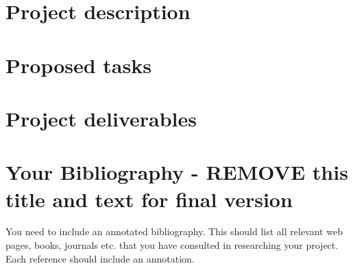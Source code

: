 \documentclass[11pt,fleqn,twoside]{article}
\begin{document}
\wordcount{}

\mmp

\setcounter{tocdepth}{3} %


\section{Project description}


\section{Proposed tasks}


\section{Project deliverables}

%
%
\section*{Your Bibliography - REMOVE this title and text for final version}
%
You need to include an annotated bibliography. This should list all relevant web pages, books, journals etc. that you have consulted in researching your project. Each reference should include an annotation.
\end{document}
